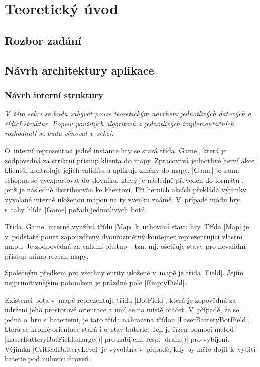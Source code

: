 
\section{Teoretický úvod}

\subsection{Rozbor zadání}
\subsection{Návrh architektury aplikace}

\subsubsection{Návrh interní struktury}

\textit{
	V~této sekci se budu zabývat pouze teoretickým návrhem jednotlivých datových a řídící struktur. Popisu použitých algoritmů a jednotlivých implementačních rozhodnutí se budu věnovat v~sekci.
}

O~interní reprezentaci jedné instance hry se stará třída \ic|Game|, která je zodpovědná za striktní přístup klienta do mapy. Zpracovává jednotlivé herní akce klientů, kontroluje jejich validitu a aplikuje změny do mapy. \ic|Game| je sama schopna se vyexportovat do slovníku, který je následně převeden do formátu , jenž je následně distribuován ke klientovi. Při herních akcích překládá výjimky vyvolané interně uloženou mapou na ty zvenku známé. V~případě módu hry s~tahy hlídá \ic|Game| pořadí jednotlivých botů.

Třída \ic|Game| interně využívá třídu \ic|Map| k~uchování stavu hry. Třída \ic|Map| je v~podstatě pouze zapouzdřený dvourozměrný kontejner reprezentující vlastní mapu. Je zodpovědná za validní přístup - tzn. mj. ošetřuje stavy pro nevalidní přístup mimo rozsah mapy.

Společným předkem pro všechny entity uložené v~mapě je třída \ic|Field|. Jejím nejprimitivnějším potomkem je prázdné pole \ic|EmptyField|.

\begin{sloppypar}
	Existenci bota v~mapě reprezentuje třída \ic|BotField|, která je zopovědná za udržení jeho prostorové orientace a umí se na místě otáčet. V~případě, že se jedná o~hru s~bateriemi, je tato třída nahrazena třídou \ic|LaserBatteryBotField|, která se kromě orientace stará i o~stav baterie. Ten je řízen pomocí metod \ic|LaserBatteryBotField.charge()| pro nabíjení, resp. \ic|drain()| pro vybíjení. Výjimka \ic|CriticalBatteryLevel| je vyvolána v~případě, kdy by mělo dojít k~vybití baterie pod nulovou úrove\v{n}.
\end{sloppypar}

